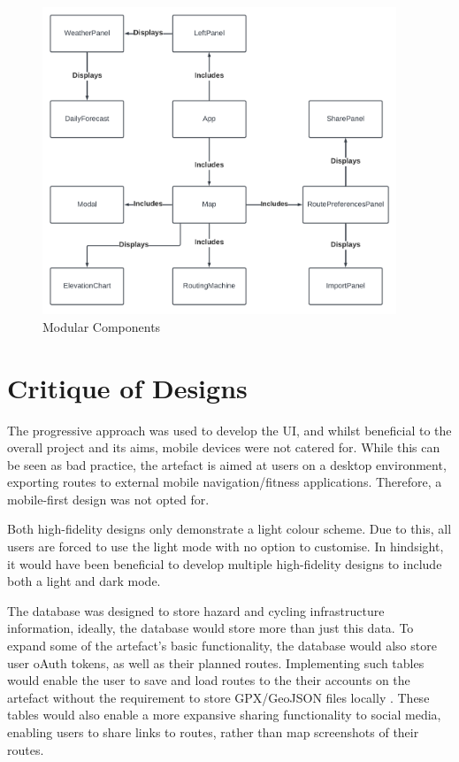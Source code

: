 \begin{figure}[!ht]
  \centering
  \includegraphics[width=400px]{figures/components.pdf}
  \caption{Modular Components}
  \label{fig:components}
\end{figure}

\clearpage
\section{Critique of Designs}
\label{design:critique}

The progressive approach was used to develop the UI, and whilst beneficial to the overall project and its aims, mobile devices were not catered for. While this can be seen as bad practice, the artefact is aimed at users on a desktop environment, exporting routes to external mobile navigation/fitness applications. Therefore, a mobile-first design was not opted for.

Both high-fidelity designs only demonstrate a light colour scheme. Due to this, all users are forced to use the light mode with no option to customise. In hindsight, it would have been beneficial to develop multiple high-fidelity designs to include both a light and dark mode.

The database was designed to store hazard and cycling infrastructure information, ideally, the database would store more than just this data. To expand some of the artefact's basic functionality, the database would also store user oAuth tokens, as well as their planned routes. Implementing such tables would enable the user to save and load routes to the their accounts on the artefact without the requirement to store GPX/GeoJSON files locally . These tables would also enable a more expansive sharing functionality to social media, enabling users to share links to routes, rather than map screenshots of their routes.

